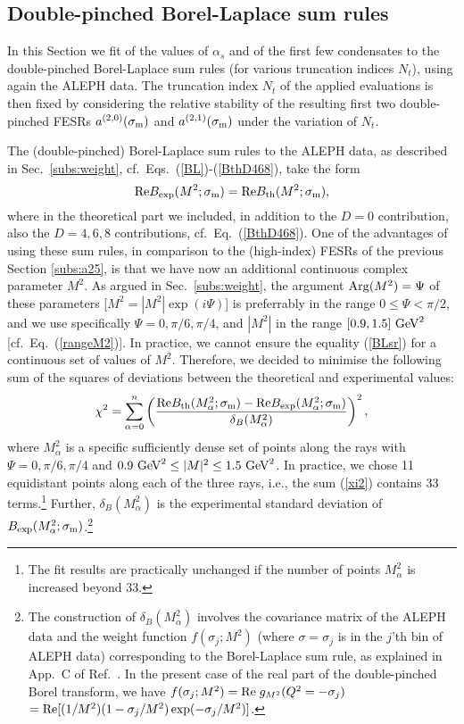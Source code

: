 \documentclass[aps,nofootinbib,showkeys,noshowpacs,preprintnumbers,amsmath,amssymb]{revtex4}
\def\be{\begin{equation}}
\def\ee{\end{equation}}
\newcommand{\sm}{{\sigma_{\rm m}}}
\begin{document}
\subsection{Double-pinched Borel-Laplace sum rules}
\label{subs:BL}

In this Section we fit of the values of $\alpha_s$ and of the first few condensates to the double-pinched Borel-Laplace sum rules (for various truncation indices $N_t$), using again the ALEPH data. The truncation index $N_t$ of the applied evaluations is then fixed by considering the relative stability of the resulting first two double-pinched FESRs $a^{(2,0)}(\sm)$ and $a^{(2,1)}(\sm)$ under the variation of $N_t$.
  
The (double-pinched) Borel-Laplace sum rules to the ALEPH data, as described in Sec.~\ref{subs:weight}, cf.~Eqs.~(\ref{BL})-(\ref{BthD468}), take the form
\be
{\rm Re} B_{\rm exp}(M^2;\sm) = {\rm Re} B_{\rm th}(M^2;\sm),
\label{BLsr} \ee
where in the theoretical part we included, in addition to the $D=0$ contribution, also the $D=4,6,8$ contributions, cf.~Eq.~(\ref{BthD468}). One of the advantages of using these sum rules, in comparison to the (high-index) FESRs of the previous Section \ref{subs:a25}, is that we have now an additional continuous complex parameter $M^2$. As argued in Sec.~\ref{subs:weight}, the argument ${\rm Arg}(M^2)=\Psi$ of these parameters [$M^2=|M^2| \exp(i \Psi)$] is preferrably in the range $0 \leq \Psi < \pi/2$, and we use specifically $\Psi = 0, \pi/6, \pi/4$, and $|M^2|$ in the range $[0.9, 1.5] \ {\rm GeV}^2$ [cf.~Eq.~(\ref{rangeM2})]. In practice, we cannot ensure the equality (\ref{BLsr}) for a continuous set of values of $M^2$. Therefore, we decided to minimise the following sum of the squares of deviations between the theoretical and experimental values:
\be
\chi^2 = \sum_{\alpha=0}^n \left( \frac{ {\rm Re} B_{\rm th}(M^2_{\alpha};\sm) - {\rm Re} B_{\rm exp}(M^2_{\alpha};\sm) }{\delta_B(M^2_{\alpha})} \right)^2 ,
\label{xi2} \ee
where $M_{\alpha}^2$ is a specific sufficiently dense set of points along the rays with $\Psi=0, \pi/6, \pi/4$  and $0.9 \ {\rm GeV}^2 \leq |M|^2 \leq 1.5 \ {\rm GeV}^2$. In practice, we chose 11 equidistant points along each of the three rays, i.e., the sum (\ref{xi2}) contains 33 terms.\footnote{The fit results are practically unchanged if the number of points $M^2_{\alpha}$ is increased beyond 33.} Further, $\delta_B(M^2_{\alpha})$ is the experimental standard deviation of $B_{\rm exp}(M^2_{\alpha};\sm)$.\footnote{The construction of $\delta_B(M^2_{\alpha})$ involves the covariance matrix of the ALEPH data and the weight function $f(\sigma_j; M^2)$ (where $\sigma=\sigma_j$ is in the $j$'th bin of ALEPH data) corresponding to the Borel-Laplace sum rule, as explained in App.~C of Ref.~\cite{3dAQCD}. In the present case of the real part of the double-pinched Borel transform, we have  $f(\sigma_j; M^2)={\rm Re} \; g_{M^2}(Q^2=-\sigma_j)$ $= {\rm Re} [ (1/M^2) (1 - \sigma_j/M^2) \exp(-\sigma_j/M^2) ]$.}
\end{document}
